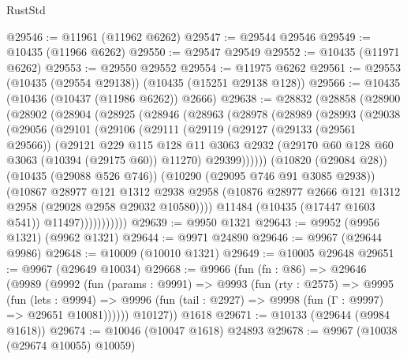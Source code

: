 \begin{lexlean}{RustStd}
\begin{coremodule}
@29546 := @11961 (@11962 @6262)
@29547 := @29544 @29546
@29549 := @10435 (@11966 @6262)
@29550 := @29547 @29549
@29552 := @10435 (@11971 @6262)
@29553 := @29550 @29552
@29554 := @11975 @6262
@29561 := @29553 (@10435 (@29554 @29138)) (@10435 (@15251 @29138 @128))
@29566 := @10435 (@10436 (@10437 (@11986 @6262)) @2666)
@29638 := @28832
    (@28858
      (@28900
        (@28902
          (@28904
            (@28925
              (@28946
                (@28963
                  (@28978
                    (@28989
                      (@28993
                        (@29038
                          (@29056
                            (@29101
                              (@29106
                                (@29111
                                  (@29119
                                    (@29127
                                      (@29133 (@29561 @29566))
                                      (@29121
                                        @229
                                        @115
                                        @128
                                        @11
                                        @3063
                                        @2932
                                        (@29170 @60 @128 @60 @3063 (@10394 (@29175 @60)) @11270)
                                        @29399))))))
                            (@10820 (@29084 @28))
                            (@10435 (@29088 @526 @746))
                            (@10290 (@29095 @746 @91 @3085 @2938))
                            (@10867
                              @28977
                              @121
                              @1312
                              @2938
                              @2958
                              (@10876 @28977 @2666 @121 @1312 @2958 (@29028 @2958 @29032 @10580))))
                          @11484
                          (@10435 (@17447 @1603 @541))
                          @11497)))))))))))
@29639 := @9950 @1321
@29643 := @9952 (@9956 @1321) (@9962 @1321)
@29644 := @9971 @24890
@29646 := @9967 (@29644 @9986)
@29648 := @10009 (@10010 @1321)
@29649 := @10005 @29648
@29651 := @9967 (@29649 @10034)
@29668 := @9966
    (fun (fn : @86) =>
    @29646
      (@9989
        (@9992
          (fun (params : @9991) =>
          @9993
            (fun (rty : @2575) =>
            @9995
              (fun (lets : @9994) =>
              @9996 (fun (tail : @2927) => @9998 (fun (Γ : @9997) => @29651 @10081))))))
        @10127))
    @1618
@29671 := @10133 (@29644 (@9984 @1618))
@29674 := @10046 (@10047 @1618) @24893
@29678 := @9967 (@10038 (@29674 @10055) @10059)

\end{coremodule}
\end{lexlean}

